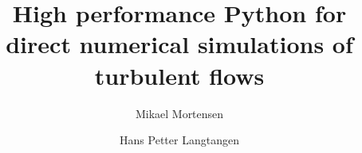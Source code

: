 \documentclass[final,1p,times]{elsarticle}
\begin{document}
\begin{frontmatter}



\title{High performance Python for direct numerical simulations of turbulent flows}


\author[a,b]{Mikael Mortensen}
\author[b,c]{Hans Petter Langtangen}
\address[a]{Department of Mathematics, University of Oslo, Norway}
\address[b]{Center for Biomedical Computing at Simula Research Laboratory, N-1325 Lysaker, Norway}
\address[c]{Department of Informatics, University of Oslo, Norway}


\newcommand{\hpl}[1]{({\bf hpl comment:} \emph{#1})}







\end{frontmatter}
\end{document}
